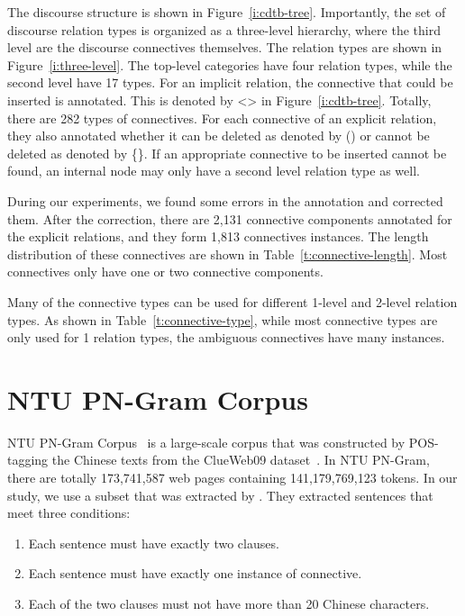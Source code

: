 The discourse structure is shown in Figure~\ref{i:cdtb-tree}. Importantly,
the set of discourse relation types is organized as a three-level hierarchy,
where the third level are the discourse connectives themselves. The relation
types are shown in Figure~\ref{i:three-level}. The top-level categories have
four relation types, while the second level have 17 types. For an implicit
relation, the connective that could be inserted is annotated. This is denoted
by <> in Figure~\ref{i:cdtb-tree}. Totally, there are 282 types of connectives.
For each connective of an explicit relation,
they also annotated whether it can be deleted as denoted by () or cannot be
deleted as denoted by \{\}.
If an appropriate connective to be inserted cannot be found, an internal
node may only have a second level relation type as well.





During our experiments, we found some errors in the annotation and corrected
them. After the correction, there are 2,131 connective components annotated
for the explicit relations, and they form 1,813 connectives instances. The length
distribution of these connectives are shown in Table~\ref{t:connective-length}.
Most connectives only have one or two connective components.



Many of the connective types can be used for different 1-level and 2-level
relation types. As shown in Table~\ref{t:connective-type}, while most connective
types are only used for 1 relation types, the ambiguous connectives have many
instances.



\section{NTU PN-Gram Corpus}

NTU PN-Gram Corpus~\citep{yu2012development} is a large-scale corpus that was
constructed by POS-tagging the Chinese texts from the ClueWeb09
dataset~\citep{callan2009clueweb09}. In NTU PN-Gram, there are totally 173,741,587
web pages containing 141,179,769,123 tokens. In our study, we use a subset that
was extracted by \cite{huang2014interpretation}. They extracted sentences that
meet three conditions:

\begin{enumerate}
\item Each sentence must have exactly two clauses.
\item Each sentence must have exactly one instance of connective.
\item Each of the two clauses must not have more than 20 Chinese characters.
\end{enumerate}

